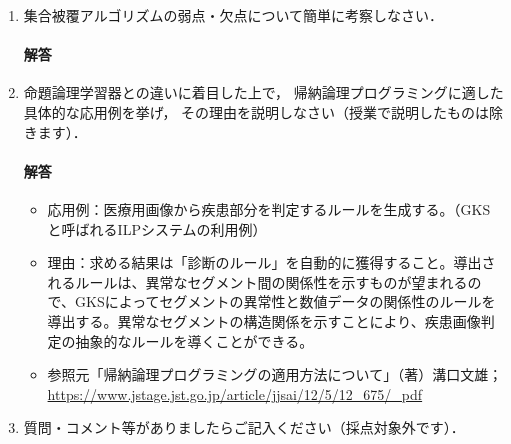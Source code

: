 \documentclass[dvipdfmx]{jsarticle}
\begin{document}
\begin{enumerate}
\item
  集合被覆アルゴリズムの弱点・欠点について簡単に考察しなさい．
  \paragraph{解答}


\item
  命題論理学習器との違いに着目した上で，
  帰納論理プログラミングに適した具体的な応用例を挙げ，
  その理由を説明しなさい（授業で説明したものは除きます）．
  \paragraph{解答}
\begin{itemize}
  \item 応用例：医療用画像から疾患部分を判定するルールを生成する。（GKSと呼ばれるILPシステムの利用例）
  \item 理由：求める結果は「診断のルール」を自動的に獲得すること。導出されるルールは、異常なセグメント間の関係性を示すものが望まれるので、GKSによってセグメントの異常性と数値データの関係性のルールを導出する。異常なセグメントの構造関係を示すことにより、疾患画像判定の抽象的なルールを導くことができる。
  \item 参照元「帰納論理プログラミングの適用方法について」（著）溝口文雄；\url{https://www.jstage.jst.go.jp/article/jjsai/12/5/12_675/_pdf}
\end{itemize}


\item 質問・コメント等がありましたらご記入ください（採点対象外です）．

\end{enumerate}
\end{document}

